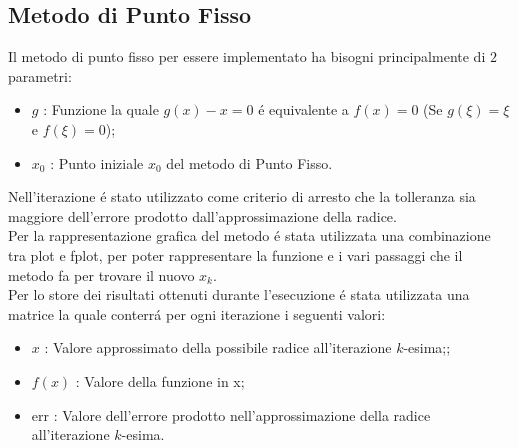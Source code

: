 \documentclass[12pt, letterpaper]{article}
\begin{document}
\newpage

\subsection{Metodo di Punto Fisso}
Il metodo di punto fisso per essere implementato ha bisogni principalmente di $2$ parametri:
\begin{itemize}
    \item $g$   : Funzione la quale $g(x)-x=0$ \'e equivalente a $f(x)=0$ (Se $g(\xi)=\xi$ e $f(\xi)=0$);
    \item $x_0$ : Punto iniziale $x_0$ del metodo di Punto Fisso.
\end{itemize}
Nell'iterazione \'e stato utilizzato come criterio di arresto che la tolleranza sia maggiore dell'errore prodotto dall'approssimazione della radice. \\
Per la rappresentazione grafica del metodo \'e stata utilizzata una combinazione tra plot e fplot, per poter rappresentare la funzione e i vari passaggi che il metodo fa per trovare il nuovo $x_k$. \\
Per lo store dei risultati ottenuti durante l'esecuzione \'e stata utilizzata una matrice la quale conterr\'a per ogni iterazione i seguenti valori:
\begin{itemize}
    \item $x$    : Valore approssimato della possibile radice all'iterazione $k$-esima;;
    \item $f(x)$ : Valore della funzione in x;
    \item err   : Valore dell'errore prodotto nell'approssimazione della radice all'iterazione $k$-esima.
\end{itemize} 
\end{document}
